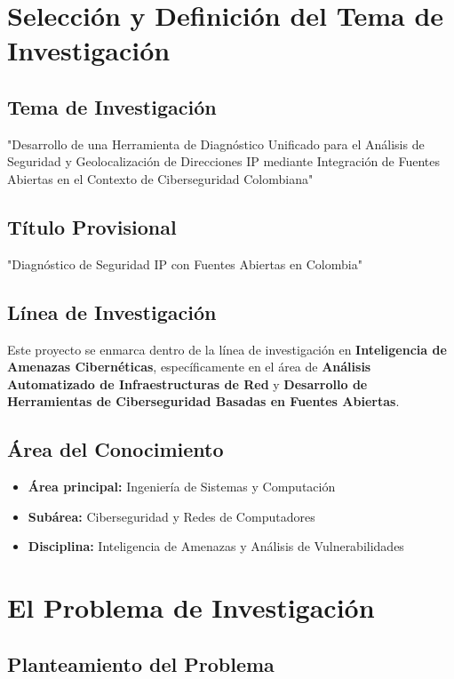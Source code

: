 \section{Selección y Definición del Tema de Investigación}

\subsection{Tema de Investigación}
"Desarrollo de una Herramienta de Diagnóstico Unificado para el Análisis de Seguridad y Geolocalización de Direcciones IP mediante Integración de Fuentes Abiertas en el Contexto de Ciberseguridad Colombiana"

\subsection{Título Provisional}
"Diagnóstico de Seguridad IP con Fuentes Abiertas en Colombia"

\subsection{Línea de Investigación}
Este proyecto se enmarca dentro de la línea de investigación en \textbf{Inteligencia de Amenazas Cibernéticas}, específicamente en el área de \textbf{Análisis Automatizado de Infraestructuras de Red} y \textbf{Desarrollo de Herramientas de Ciberseguridad Basadas en Fuentes Abiertas}.

\subsection{Área del Conocimiento}
\begin{itemize}
    \item \textbf{Área principal:} Ingeniería de Sistemas y Computación
    \item \textbf{Subárea:} Ciberseguridad y Redes de Computadores
    \item \textbf{Disciplina:} Inteligencia de Amenazas y Análisis de Vulnerabilidades
\end{itemize}

\section{El Problema de Investigación}

\subsection{Planteamiento del Problema}

